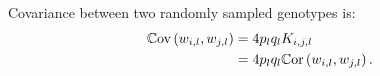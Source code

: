 %
Covariance between two randomly sampled genotypes is:
%
\begin{align} \label{eqn:geno_cov}
  \mathbb{C}\text{ov}\left(w_{i,l}, w_{j,l}\right) & = 4 p_l q_l K_{i,j,l} \\
                                    & = 4 p_l q_l \mathbb{C}\text{or}\left(w_{i,l}, w_{j,l}\right). \notag
\end{align}

